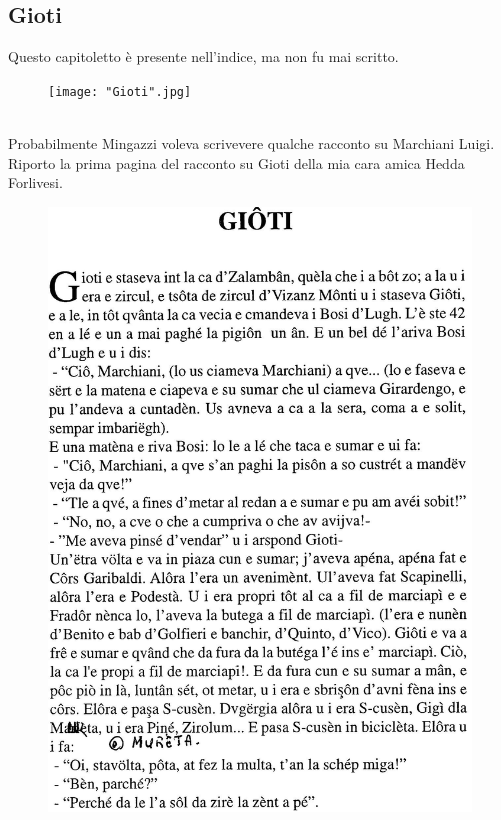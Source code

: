 \documentclass[10pt]{memoir} %
\begin{document}
\subsection{Gioti}
Questo capitoletto è presente nell'indice, ma non fu mai scritto.\\
\begin{figure}[!htbp]
   \texttt{[image: "Gioti".jpg]}
\end{figure}
\\Probabilmente Mingazzi voleva scrivevere qualche racconto su Marchiani Luigi. Riporto la prima pagina del racconto su Gioti della mia cara amica Hedda Forlivesi.\\
 \begin{figure}[htb]
    \centering
    \includegraphics[width=\textwidth]{Gioti2}
\end{figure}
\end{document}
